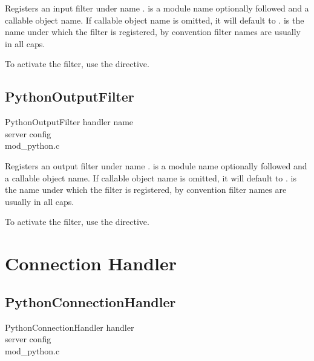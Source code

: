 Registers an input filter  under name
.  is a module name optionally followed
\code{::} and a callable object name. If callable object name is
omitted, it will default to .  is the name under
which the filter is registered, by convention filter names are usually
in all caps.

To activate the filter, use the  directive.

\subsection{PythonOutputFilter\label{dir-filter-of}}

PythonOutputFilter handler name\\
server config\\
mod_python.c

Registers an output filter  under name
.  is a module name optionally followed
\code{::} and a callable object name. If callable object name is
omitted, it will default to .  is the name under
which the filter is registered, by convention filter names are usually
in all caps.

To activate the filter, use the  directive.

\section{Connection Handler\label{dir-conn}}

\subsection{PythonConnectionHandler\label{dir-conn-ch}}

PythonConnectionHandler handler\\
server config\\
mod_python.c

